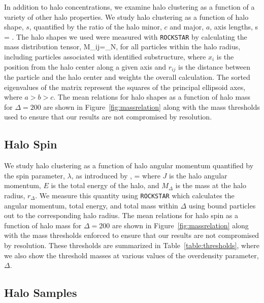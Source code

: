 \documentclass[usenatbib,fleqn]{mnras}
\begin{document}
In addition to halo concentrations, we examine halo clustering as a function of a variety of other halo properties. We study halo clustering as a function of halo shape, $s$, quantified by the ratio of the halo minor, $c$ and major, $a$, axis lengths, 
%
\beq
s = .
\eeq
%
The halo shapes we used were measured with {\tt ROCKSTAR} by calculating the mass distribution tensor,
\beq
M_{ij}=\sum\limits_{N},
\eeq
for all particles within the halo radius, including particles associated with identified substructure, where $x_i$ is the position from the halo center along a given axis and $r_{ij}$ is the distance between the particle and the halo center and weights the overall calculation. The sorted eigenvalues of the matrix represent the squares of the principal ellipsoid axes, where $a > b > c$. The mean relations for halo shapes as a function of halo mass for $\Delta=200$ are shown in Figure~\ref{fig:massrelation} along with the mass thresholds used to ensure that our results are not compromised by 
resolution.


\subsection{Halo Spin}

We study halo clustering as a function of halo angular momentum quantified 
by the spin parameter, $\lambda$, as introduced by \citep{peebles69},
\beq
\lambda = 
\eeq
where $J$ is the halo angular momentum, $E$ is the total energy of the 
halo, and $M_{\Delta}$ is the mass at the halo radius, $r_{\Delta}$. We measure this quantity using {\tt ROCKSTAR} which calculates the angular momentum, total energy, and total mass within $\Delta$ using bound particles out to the corresponding halo radius.
The mean relations for halo spin as a function of halo mass for $\Delta=200$ are shown in Figure~\ref{fig:massrelation} along with the mass thresholds enforced to ensure that our results are not compromised by resolution. These thresholds are summarized in Table~\ref{table:thresholds}, where we also show the threshold masses at various values of the overdensity parameter, $\Delta$.


\subsection{Halo Samples}
\end{document}
